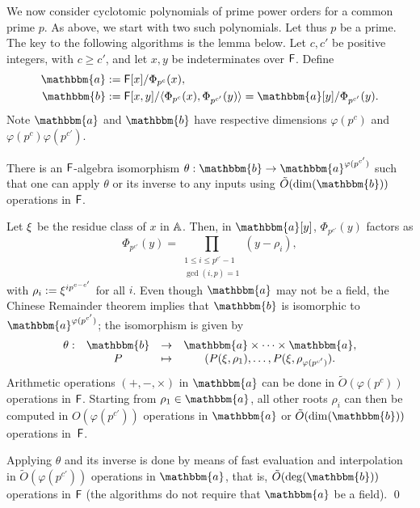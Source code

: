 We now consider cyclotomic polynomials of prime power
orders for a common prime $p$. As above, we start with two such polynomials.
Let thus $p$ be a prime. The key to the following algorithms is the
lemma below.  Let $c,c'$ be positive integers, with $c \ge
c'$, and let $x,y$ be indeterminates over ${\mathsf{F}}$. Define
\begin{align}
\mathbbm{a}&:=\F[x]/\Phi_{p^c}(x),  \\
\mathbbm{b}&:=\F[x,y]/\langle \Phi_{p^c}(x), \Phi_{p^{c'}}(y)\rangle = \mathbbm{a}[y]/\Phi_{p^{c'}}(y).
\end{align}
Note $\mathbbm{a}$ and $\mathbbm{b}$ have respective dimensions
$\varphi(p^c)$ and $\varphi(p^c) \varphi(p^{c'})$.

\smallskipback
\begin{lemma}
  There is an ${\mathsf{F}}$-algebra isomorphism $\theta: \mathbbm{b} \to
  \mathbbm{a}^{\varphi(p^{c'})}$ such that one can apply $\theta$ or
  its inverse to any inputs using $\tilde{O}(\dim(\mathbbm{b}))$ operations in ${\mathsf{F}}$.
\end{lemma}

\smallskipback
{}
  Let $\xi$ be the residue class of
  $x$ in $\mathbb{A}$. Then, in $\mathbbm{a}[y]$, $\Phi_{p^{c'}}(y)$ factors as
  $$\Phi_{p^{c'}}(y) =\prod_{\substack{1 \le i\le p^{c'}-1\\ \gcd(i,p)
      =1}} (y-\rho_i),$$ with $\rho_i:={\xi}^{i p^{c-c'}}$ for all
  $i$.  Even though $\mathbbm{a}$ may not be a field, the Chinese
  Remainder theorem implies that $\mathbbm{b}$ is isomorphic to
  $\mathbbm{a}^{\varphi(p^{c'})}$; the isomorphism is given by
  $$\begin{array}{cccc}
    \theta: & \mathbbm{b} & \to & \mathbbm{a} \times \cdots \times \mathbbm{a}, \\
    & P & \mapsto& (P(\xbar,\rho_1),\dots,P(\xbar,\rho_{\varphi(p^{c'})}).
  \end{array}$$
  Arithmetic operations $(+,-,\times)$ in
  $\mathbbm{a}$ can be done in $\tilde{O}(\varphi(p^c))$ operations
  in ${\mathsf{F}}$. Starting from $\rho_1 \in \mathbbm{a}$, all other roots
  $\rho_i$ can then be computed in $O(\varphi(p^{c'}))$ operations in
  $\mathbbm{a}$ or $\tilde{O}(\dim(\mathbbm{b}))$
  operations in~${\mathsf{F}}$. 
  
Applying $\theta$ and its inverse is done by means of fast evaluation
and interpolation~\cite[Chapter~10]{vzGathen13} in $\tilde{O}(\varphi(p^{c'}))$
operations in $\mathbbm{a}$, that is, $\tilde{O}(\deg(\mathbbm{b}))$ operations in ${\mathsf{F}}$
(the algorithms do not require that $\mathbbm{a}$ be a field).
\qed

